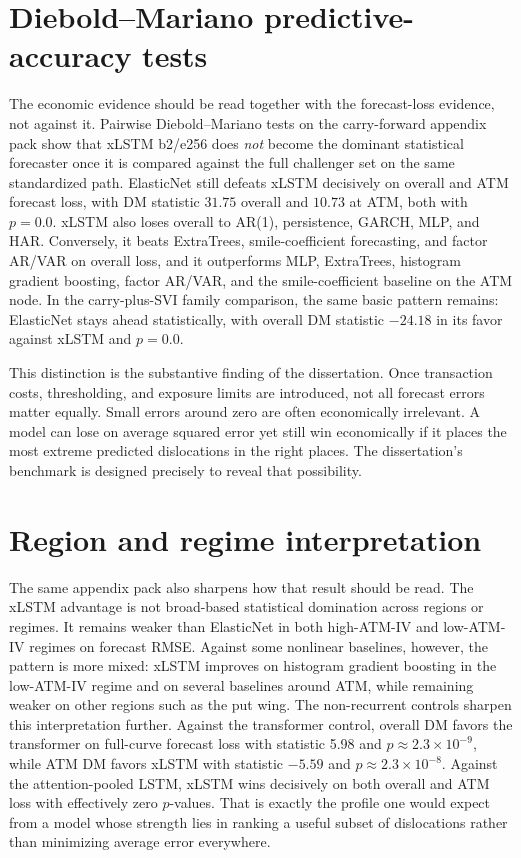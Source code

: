 \documentclass[12pt]{report}
\begin{document}
\section{Diebold--Mariano predictive-accuracy tests}
The economic evidence should be read together with the forecast-loss evidence, not against it. Pairwise Diebold--Mariano tests \citep{diebold1995} on the carry-forward appendix pack show that xLSTM b2/e256 does \emph{not} become the dominant statistical forecaster once it is compared against the full challenger set on the same standardized path. ElasticNet still defeats xLSTM decisively on overall and ATM forecast loss, with DM statistic \(31.75\) overall and \(10.73\) at ATM, both with \(p=0.0\). xLSTM also loses overall to AR(1), persistence, GARCH, MLP, and HAR. Conversely, it beats ExtraTrees, smile-coefficient forecasting, and factor AR/VAR on overall loss, and it outperforms MLP, ExtraTrees, histogram gradient boosting, factor AR/VAR, and the smile-coefficient baseline on the ATM node. In the carry-plus-SVI family comparison, the same basic pattern remains: ElasticNet stays ahead statistically, with overall DM statistic \(-24.18\) in its favor against xLSTM and \(p=0.0\).

This distinction is the substantive finding of the dissertation. Once transaction costs, thresholding, and exposure limits are introduced, not all forecast errors matter equally. Small errors around zero are often economically irrelevant. A model can lose on average squared error yet still win economically if it places the most extreme predicted dislocations in the right places. The dissertation's benchmark is designed precisely to reveal that possibility.

\section{Region and regime interpretation}
The same appendix pack also sharpens how that result should be read. The xLSTM advantage is not broad-based statistical domination across regions or regimes. It remains weaker than ElasticNet in both high-ATM-IV and low-ATM-IV regimes on forecast RMSE. Against some nonlinear baselines, however, the pattern is more mixed: xLSTM improves on histogram gradient boosting in the low-ATM-IV regime and on several baselines around ATM, while remaining weaker on other regions such as the put wing. The non-recurrent controls sharpen this interpretation further. Against the transformer control, overall DM favors the transformer on full-curve forecast loss with statistic 5.98 and \(p \approx 2.3\times10^{-9}\), while ATM DM favors xLSTM with statistic \(-5.59\) and \(p \approx 2.3\times10^{-8}\). Against the attention-pooled LSTM, xLSTM wins decisively on both overall and ATM loss with effectively zero \(p\)-values. That is exactly the profile one would expect from a model whose strength lies in ranking a useful subset of dislocations rather than minimizing average error everywhere.
\end{document}
